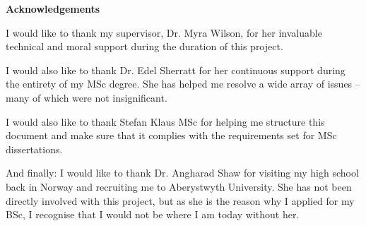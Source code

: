 \thispagestyle{empty}

\begin{center}
    {\LARGE\bf Acknowledgements}
\end{center}

I would like to thank my supervisor, Dr. Myra Wilson, for her invaluable technical and moral support during the duration of this project.

I would also like to thank Dr. Edel Sherratt for her continuous support during the entirety of my MSc degree. She has helped me resolve a wide array of issues -- many of which were not insignificant.

I would also like to thank Stefan Klaus MSc for helping me structure this document and make sure that it complies with the requirements set for MSc dissertations.

And finally: I would like to thank Dr. Angharad Shaw for visiting my high school back in Norway and recruiting me to Aberystwyth University.
She has not been directly involved with this project, but as she is the reason why I applied for my BSc, I recognise that I would not be where I am today without her.